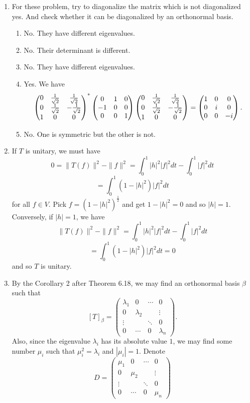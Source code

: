 \begin{enumerate}
\item For these problem, try to diagonalize the matrix which is not diagonalized yes. And check whether it can be diagonalized by an orthonormal basis.
\begin{enumerate}
\item No. They have different eigenvalues.
\item No. Their determinant is different.
\item No. They have different eigenvalues.
\item Yes. We have 
\[\begin{pmatrix}0&\frac{1}{\sqrt{2}}&\frac{1}{\sqrt{2}}\\0&\frac{1}{\sqrt{2}}&-\frac{1}{\sqrt{2}}\\1&0&0\end{pmatrix}^*\begin{pmatrix}0 & 1 & 0\cr -1 & 0 & 0\cr 0 & 0 & 1\end{pmatrix}\begin{pmatrix}0&\frac{1}{\sqrt{2}}&\frac{1}{\sqrt{2}}\\0&\frac{1}{\sqrt{2}}&-\frac{1}{\sqrt{2}}\\1&0&0\end{pmatrix}=\begin{pmatrix}1 & 0 & 0\cr 0 & i & 0\cr 0 & 0 & -i\end{pmatrix}.\]
\item No. One is symmetric but the other is not.
\end{enumerate}
\item If $T$ is unitary, we must have 
\[0=\|T(f)\|^2-\|f\|^2=\int_0^1{|h|^2|f|^2dt}-\int_0^1{|f|^2dt}\]
\[=\int_0^1{(1-|h|^2)|f|^2dt}\]
for all $f\in V$. Pick $f=(1-|h|^2)^{\frac{1}{2}}$ and get $1-|h|^2=0$ and so $|h|=1$. Conversely, if $|h|=1$, we have 
\[\|T(f)\|^2-\|f\|^2=\int_0^1{|h|^2|f|^2dt}-\int_0^1{|f|^2dt}\]
\[=\int_0^1{(1-|h|^2)|f|^2dt}=0\]
and so $T$ is unitary.
\item By the Corollary 2 after Theorem 6.18, we may find an orthonormal basis $\beta $ such that 
\[[T]_{\beta}=\begin{pmatrix}\lambda_1&0&\cdots &0\\0&\lambda_2& &\vdots\\ \vdots &&\ddots &0\\0&\cdots &0&\lambda_n\end{pmatrix}.\]
Also, since the eigenvalue $\lambda_i$ has its absolute value $1$, we may find some number $\mu_i$ such that $\mu_i^2=\lambda_i$ and $|\mu_i|=1$. Denote 
\[D=\begin{pmatrix}\mu_1&0&\cdots &0\\0&\mu_2& &\vdots\\ \vdots &&\ddots &0\\0&\cdots &0&\mu_n\end{pmatrix}\]

\end{enumerate}
